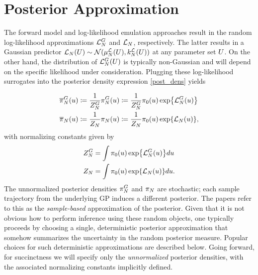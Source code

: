 \documentclass[12pt]{article}
\begin{document}
\section{Posterior Approximation}
The forward model and log-likelihood emulation approaches result in the random log-likelihood approximations 
$\llikEmFwd[\Ndesign]$ and $\llikEm[\Ndesign]$, respectively. The latter results in a Gaussian predictor 
$\llikEm[\Ndesign](\parMat) \sim \Gaussian(\emMean[\Ndesign]{\llik}(\parMat), \emKer[\Ndesign]{\llik}(\parMat))$ 
at any parameter set $\parMat$. On the other hand, the distribution of $\llikEmFwd[\Ndesign](\parMat)$ is 
typically non-Gaussian and will depend on the specific likelihood under consideration.
Plugging these log-likelihood surrogates into the posterior density expression \ref{post_dens} yields

\begin{align}
\fwdEmRdm[\Ndesign]{\postDensNorm}(\Par) 
&\Def \frac{1}{\fwdEmRdm[\Ndesign]{\normCst}} \fwdEmRdmDens[\Ndesign](\Par) 
\Def  \frac{1}{\fwdEmRdm[\Ndesign]{\normCst}} \priorDens(\Par) \Exp{\llikEmFwd[\Ndesign](\Par)} \label{post_dens_random_fwd} \\
\llikEmRdm[\Ndesign]{\postDensNorm}(\Par) 
&\Def \frac{1}{\llikEmRdm[\Ndesign]{\normCst}} \llikEmRdmDens[\Ndesign](\Par) 
\Def \frac{1}{\llikEmRdm[\Ndesign]{\normCst}} \priorDens(\Par) \Exp{\llikEm[\Ndesign](\Par)} \label{post_dens_random_llik},
\end{align}
with normalizing constants given by 
\begin{align}
\fwdEmRdm[\Ndesign]{\normCst}
&= \int \priorDens(\Par) \Exp{\llikEmFwd[\Ndesign](\Par)} d\Par \label{norm_cst_random_fwd} \\
\llikEmRdm[\Ndesign]{\normCst}
&= \int \priorDens(\Par) \Exp{\llikEm[\Ndesign](\Par)} d\Par \label{norm_cst_random_llik}. 
\end{align}
The unnormalized posterior densities $\fwdEmRdmDens[\Ndesign]$ and $\llikEmRdmDens[\Ndesign]$ are stochastic; 
each sample trajectory from the underlying GP induces a different posterior. 
The papers \cite{StuartTeck1, StuartTeck2} refer to this as the \textit{sample-based}
approximation of the posterior. Given that it is not obvious how to perform inference using these random objects, one typically 
proceeds by choosing a single, deterministic posterior approximation that somehow summarizes the uncertainty in the 
random posterior measure. Popular choices for such deterministic approximations are described below. Going forward, 
for succinctness we will specify only the \textit{unnormalized} posterior densities, with the associated normalizing constants  
implicitly defined. 
\end{document}
